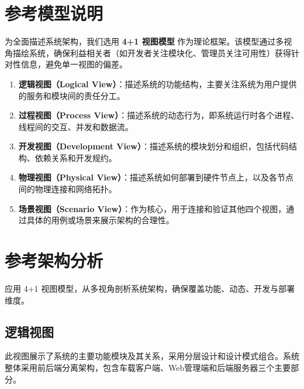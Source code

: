 \documentclass[a4paper,12pt]{article}
\begin{document}
\section{参考模型说明}
为全面描述系统架构，我们选用 \textbf{4+1 视图模型} 作为理论框架。该模型通过多视角描绘系统，确保利益相关者（如开发者关注模块化、管理员关注可用性）获得针对性信息，避免单一视图的偏差。
\begin{enumerate}
  \item \textbf{逻辑视图（Logical View）}：描述系统的功能结构，主要关注系统为用户提供的服务和模块间的责任分工。
  \item \textbf{过程视图（Process View）}：描述系统的动态行为，即系统运行时各个进程、线程间的交互、并发和数据流。
  \item \textbf{开发视图（Development View）}：描述系统的模块划分和组织，包括代码结构、依赖关系和开发规约。
  \item \textbf{物理视图（Physical View）}：描述系统如何部署到硬件节点上，以及各节点间的物理连接和网络拓扑。
  \item \textbf{场景视图（Scenario View）}：作为核心，用于连接和验证其他四个视图，通过具体的用例或场景来展示架构的合理性。
\end{enumerate}

\section{参考架构分析}
应用 4+1 视图模型，从多视角剖析系统架构，确保覆盖功能、动态、开发与部署维度。

\subsection{逻辑视图}
此视图展示了系统的主要功能模块及其关系，采用分层设计和设计模式组合。系统整体采用前后端分离架构，包含车载客户端、Web管理端和后端服务器三个主要部分。
\end{document}
